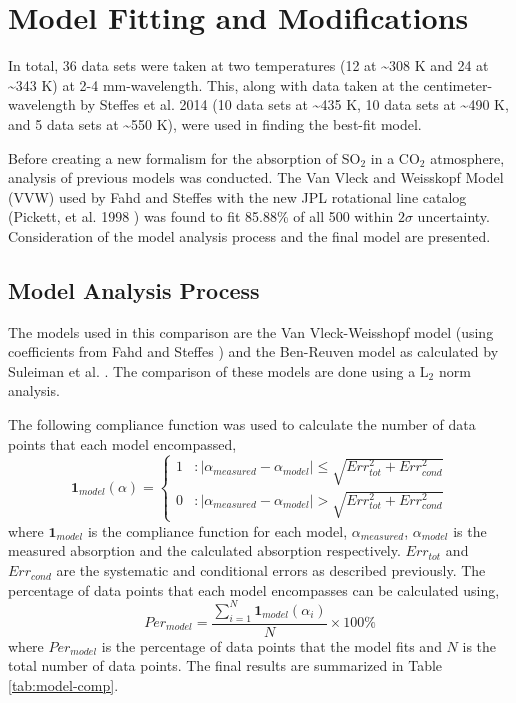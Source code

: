 \chapter{Model Fitting and Modifications}
In total, 36 data sets were taken at two temperatures (12 at \textasciitilde 308 K and 24 at \textasciitilde 343 K) at 2-4 mm-wavelength. This, along with data taken at the centimeter-wavelength by Steffes et al. 2014 \cite{Steffes-2014}(10 data sets at \textasciitilde 435 K, 10 data sets at \textasciitilde 490 K, and 5 data sets at \textasciitilde 550 K), were used in finding the best-fit model.

Before creating a new formalism for the absorption of SO$_2$ in a CO$_2$ atmosphere, analysis of previous models was conducted. The Van Vleck and Weisskopf Model (VVW) used by Fahd and Steffes \cite{Fahd-thesis} with the new JPL rotational line catalog (Pickett, et al. 1998 \cite{Pickett-1998}) was found to fit 85.88\% of all 500 within $2\sigma$ uncertainty. Consideration of the model analysis process and the final model are presented.


\section{Model Analysis Process}

The models used in this comparison are the Van Vleck-Weisshopf model (using coefficients from Fahd and Steffes \cite{Fahd-1991}) and the Ben-Reuven model as calculated by Suleiman et al. \cite{Suleiman-1996}. The comparison of these models are done using a L$_2$ norm analysis. 

The following compliance function was used to calculate the number of data points that each model encompassed,
\begin{equation}
\textbf{1}_{model}(\alpha) = \left\{
     \begin{array}{lr}
       1 & : |\alpha_{measured} - \alpha_{model}| \leq \sqrt{Err_{tot}^2 + Err_{cond}^2 }\\
       0 & : |\alpha_{measured} - \alpha_{model}| > \sqrt{Err_{tot}^2 + Err_{cond}^2 }
     \end{array}
   \right.
\end{equation}
where $\textbf{1}_{model}$ is the compliance function for each model, $\alpha_{measured}$, $\alpha_{model}$ is the measured absorption and the calculated absorption respectively. $Err_{tot}$ and $Err_{cond}$ are the systematic and conditional errors as described previously. The percentage of data points that each model encompasses can be calculated using,
\begin{equation}
Per_{model} = \frac{\sum_{i=1}^N \textbf{1}_{model}(\alpha_i)}{N}\times 100\%
\end{equation}
where $Per_{model}$ is the percentage of data points that the model fits and $N$ is the total number of data points. The final results are summarized in Table \ref{tab:model-comp}.

